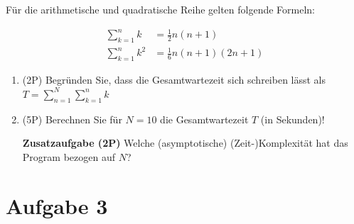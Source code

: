 \documentclass[12pt]{article}
\begin{document}
Für die arithmetische und quadratische Reihe gelten folgende Formeln:

\begin{align*}
\sum\limits_{k=1}^n k   &= \frac{1}{2}n(n+1)\\
\sum\limits_{k=1}^n k^2 &= \frac{1}{6}n(n+1)(2n+1)
\end{align*}

\begin{enumerate}[label=(\alph*)]

\item (2P) Begründen Sie, dass die Gesamtwartezeit sich schreiben lässt als $T=\sum\limits_{n=1}^{N}\sum\limits_{k=1}^n k$

\bigskip
\bigskip
\bigskip
\bigskip
\bigskip
\bigskip
\bigskip

\item (5P) Berechnen Sie für $N=10$ die Gesamtwartezeit $T$ (in Sekunden)!

\bigskip
\bigskip
\bigskip
\bigskip
\bigskip
\bigskip
\bigskip
\bigskip
\bigskip
\bigskip
\bigskip
\bigskip
\bigskip
\bigskip
\bigskip
\bigskip
\bigskip
\bigskip
\bigskip
\bigskip
\bigskip

\textbf{Zusatzaufgabe (2P)} Welche (asymptotische) (Zeit-)Komplexität hat das Program bezogen auf $N$?

\end{enumerate}

\newpage
\section* {Aufgabe 3}
\end{document}
